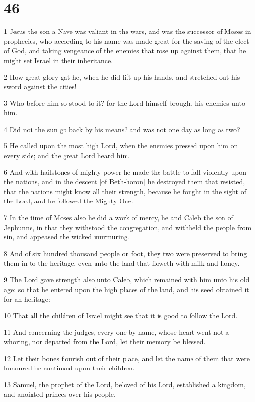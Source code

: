 \chapter{46}

\par 1 Jesus the son a Nave was valiant in the wars, and was the successor of Moses in prophecies, who according to his name was made great for the saving of the elect of God, and taking vengeance of the enemies that rose up against them, that he might set Israel in their inheritance.
\par 2 How great glory gat he, when he did lift up his hands, and stretched out his sword against the cities!
\par 3 Who before him so stood to it? for the Lord himself brought his enemies unto him.
\par 4 Did not the sun go back by his means? and was not one day as long as two?
\par 5 He called upon the most high Lord, when the enemies pressed upon him on every side; and the great Lord heard him.
\par 6 And with hailstones of mighty power he made the battle to fall violently upon the nations, and in the descent [of Beth-horon] he destroyed them that resisted, that the nations might know all their strength, because he fought in the sight of the Lord, and he followed the Mighty One.
\par 7 In the time of Moses also he did a work of mercy, he and Caleb the son of Jephunne, in that they withstood the congregation, and withheld the people from sin, and appeased the wicked murmuring.
\par 8 And of six hundred thousand people on foot, they two were preserved to bring them in to the heritage, even unto the land that floweth with milk and honey.
\par 9 The Lord gave strength also unto Caleb, which remained with him unto his old age: so that he entered upon the high places of the land, and his seed obtained it for an heritage:
\par 10 That all the children of Israel might see that it is good to follow the Lord.
\par 11 And concerning the judges, every one by name, whose heart went not a whoring, nor departed from the Lord, let their memory be blessed.
\par 12 Let their bones flourish out of their place, and let the name of them that were honoured be continued upon their children.
\par 13 Samuel, the prophet of the Lord, beloved of his Lord, established a kingdom, and anointed princes over his people.
